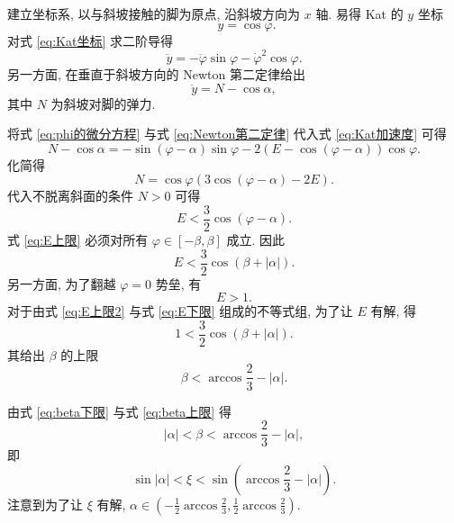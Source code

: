 \documentclass{article}
\begin{document}
建立坐标系, 以与斜坡接触的脚为原点, 沿斜坡方向为 $x$ 轴.
易得 Kat 的 $y$ 坐标
\begin{equation}
	\label{eq:Kat坐标}
	\qquad y=\cos\varphi.
\end{equation}
对式 \ref{eq:Kat坐标} 求二阶导得
\begin{equation}
	\label{eq:Kat加速度}
	\ddot y=-\ddot\varphi\sin\varphi-\dot\varphi^2\cos\varphi.
\end{equation}
另一方面, 在垂直于斜坡方向的 Newton 第二定律给出
\begin{equation}
	\label{eq:Newton第二定律}
	\ddot y=N-\cos\alpha,
\end{equation}
其中 $N$ 为斜坡对脚的弹力.

将式 \ref{eq:phi的微分方程} 与式 \ref{eq:Newton第二定律} 代入式 \ref{eq:Kat加速度} 可得
\begin{equation*}
	N-\cos\alpha=-\sin\!\left(\varphi-\alpha\right)\sin\varphi
	-2\left(E-\cos\!\left(\varphi-\alpha\right)\right)\cos\varphi.
\end{equation*}
化简得
\begin{equation}
	N=\cos\varphi\left(3\cos\!\left(\varphi-\alpha\right)-2E\right).
\end{equation}
代入不脱离斜面的条件 $N>0$ 可得
\begin{equation}
	\label{eq:E上限}
	E<\frac32\cos\!\left(\varphi-\alpha\right).
\end{equation}
式 \ref{eq:E上限} 必须对所有 $\varphi\in\left[-\beta,\beta\right]$ 成立.
因此
\begin{equation}
	\label{eq:E上限2}
	E<\frac32\cos\!\left(\beta+\left|\alpha\right|\right).
\end{equation}
另一方面, 为了翻越 $\varphi=0$ 势垒, 有
\begin{equation}
	\label{eq:E下限}
	E>1.
\end{equation}
对于由式 \ref{eq:E上限2} 与式 \ref{eq:E下限} 组成的不等式组, 为了让 $E$ 有解, 得
\begin{equation}
	1<\frac32\cos\!\left(\beta+\left|\alpha\right|\right).
\end{equation}
其给出 $\beta$ 的上限
\begin{equation}
	\label{eq:beta上限}
	\beta<\arccos\frac23-\left|\alpha\right|.
\end{equation}

由式 \ref{eq:beta下限} 与式 \ref{eq:beta上限} 得
\begin{equation*}
	\left|\alpha\right|<\beta<\arccos\frac23-\left|\alpha\right|,
\end{equation*}
即
\begin{equation}
	\sin\left|\alpha\right|<\xi<\sin\!\left(\arccos\frac23-\left|\alpha\right|\right).
\end{equation}
注意到为了让 $\xi$ 有解, $\alpha\in\left(-\frac12\arccos\frac23,\frac12\arccos\frac23\right)$.
\end{document}
